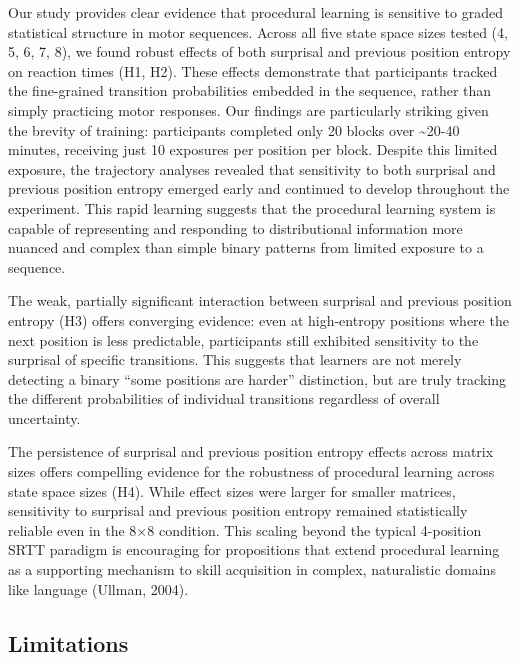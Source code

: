 \documentclass[
  10pt,
  letterpaper]{article}
\begin{document}
Our study provides clear evidence that procedural learning is sensitive
to graded statistical structure in motor sequences. Across all five
state space sizes tested (4, 5, 6, 7, 8), we found robust effects of
both surprisal and previous position entropy on reaction times (H1, H2).
These effects demonstrate that participants tracked the fine-grained
transition probabilities embedded in the sequence, rather than simply
practicing motor responses. Our findings are particularly striking given
the brevity of training: participants completed only 20 blocks over
\textasciitilde20-40 minutes, receiving just 10 exposures per position
per block. Despite this limited exposure, the trajectory analyses
revealed that sensitivity to both surprisal and previous position
entropy emerged early and continued to develop throughout the
experiment. This rapid learning suggests that the procedural learning
system is capable of representing and responding to distributional
information more nuanced and complex than simple binary patterns from
limited exposure to a sequence.

The weak, partially significant interaction between surprisal and
previous position entropy (H3) offers converging evidence: even at
high-entropy positions where the next position is less predictable,
participants still exhibited sensitivity to the surprisal of specific
transitions. This suggests that learners are not merely detecting a
binary ``some positions are harder'' distinction, but are truly tracking
the different probabilities of individual transitions regardless of
overall uncertainty.

The persistence of surprisal and previous position entropy effects
across matrix sizes offers compelling evidence for the robustness of
procedural learning across state space sizes (H4). While effect sizes
were larger for smaller matrices, sensitivity to surprisal and previous
position entropy remained statistically reliable even in the 8×8
condition. This scaling beyond the typical 4-position SRTT paradigm is
encouraging for propositions that extend procedural learning as a
supporting mechanism to skill acquisition in complex, naturalistic
domains like language (Ullman, 2004).

\subsection{Limitations}\label{limitations}
\end{document}
